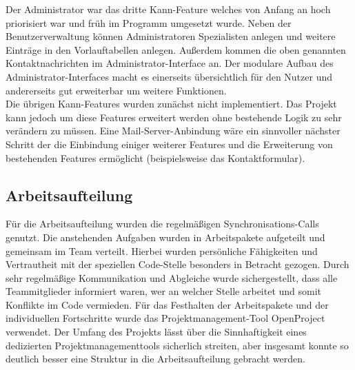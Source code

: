 Der Administrator war das dritte Kann-Feature welches von Anfang an hoch priorisiert war und früh im Programm umgesetzt wurde. Neben der Benutzerverwaltung können Administratoren Spezialisten anlegen und weitere Einträge in den Vorlauftabellen anlegen. Außerdem kommen die oben genannten Kontaktnachrichten im Administrator-Interface an. Der modulare Aufbau des Administrator-Interfaces macht es einerseits übersichtlich für den Nutzer und andererseits gut erweiterbar um weitere Funktionen.\\
Die übrigen Kann-Features wurden zunächst nicht implementiert. Das Projekt kann jedoch um diese Features erweitert werden ohne bestehende Logik zu sehr verändern zu müssen. Eine Mail-Server-Anbindung wäre ein sinnvoller nächster Schritt der die Einbindung einiger weiterer Features und die Erweiterung von bestehenden Features ermöglicht (beispielsweise das Kontaktformular).

\subsection{Arbeitsaufteilung}
\label{Arbeitsaufteilung}

Für die Arbeitsaufteilung wurden die regelmäßigen Synchronisations-Calls genutzt. Die anstehenden Aufgaben wurden in Arbeitspakete aufgeteilt und gemeinsam im Team verteilt. Hierbei wurden persönliche Fähigkeiten und Vertrautheit mit der speziellen Code-Stelle besonders in Betracht gezogen. Durch sehr regelmäßige Kommunikation und Abgleiche wurde sichergestellt, dass alle Teammitglieder informiert waren, wer an welcher Stelle arbeitet und somit Konflikte im Code vermieden.
Für das Festhalten der Arbeitspakete und der individuellen Fortschritte wurde das Projektmanagement-Tool OpenProject verwendet. Der Umfang des Projekts lässt über die Sinnhaftigkeit eines dedizierten Projektmanagementtools sicherlich streiten, aber insgesamt konnte so deutlich besser eine Struktur in die Arbeitsaufteilung gebracht werden. \\